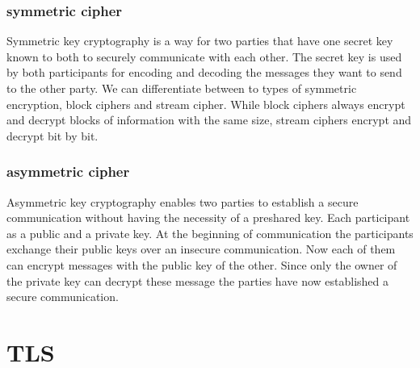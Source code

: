 \documentclass[a4paper,conference]{IEEEtran}
\begin{document}
\subsubsection{symmetric cipher}
Symmetric key cryptography is a way for two parties that have one secret key known to both to securely communicate with each other. The secret key is used by both participants for encoding and decoding the messages they want to send to the other party. We can differentiate between to types of symmetric encryption, block ciphers and stream cipher.
While block ciphers always encrypt and decrypt blocks of information with the same size, stream ciphers encrypt and decrypt bit by bit.
\subsubsection{asymmetric cipher}
Asymmetric key cryptography enables two parties to establish a secure communication without having the necessity of a preshared key. Each participant as a public and a private key. At the beginning of communication the participants exchange their public keys over an insecure communication. Now each of them can encrypt messages with the public key of the other. Since only the owner of the private key can decrypt these message the parties have now established a secure communication.






\section{TLS}

\end{document}

